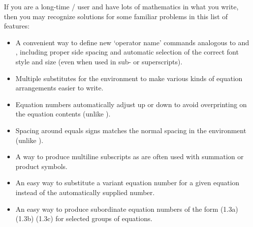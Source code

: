 \documentclass[leqno,titlepage,openany]{amsldoc}[1999/12/13]
\begin{document}
If you are a long-time \latex/ user and have lots of mathematics in what
you write, then you may recognize solutions for some familiar problems
in this list of  features:
\begin{itemize}

\item A convenient way to define new `operator name' commands analogous
to  and , including proper side spacing and automatic
selection of the correct font style and size (even when used in
sub- or superscripts).

\item Multiple substitutes for the  environment to make
various kinds of equation arrangements easier to write.

\item Equation numbers automatically adjust up or down to avoid
overprinting on the equation contents (unlike ).

\item Spacing around equals signs matches the normal spacing in the
 environment (unlike ).

\item A way to produce multiline subscripts as are often used with
summation or product symbols.

\item An easy way to substitute a variant equation number for a given
equation instead of the automatically supplied number.

\item An easy way to produce subordinate equation numbers of the form
(1.3a) (1.3b) (1.3c) for selected groups of equations.

\end{itemize}
\end{document}
